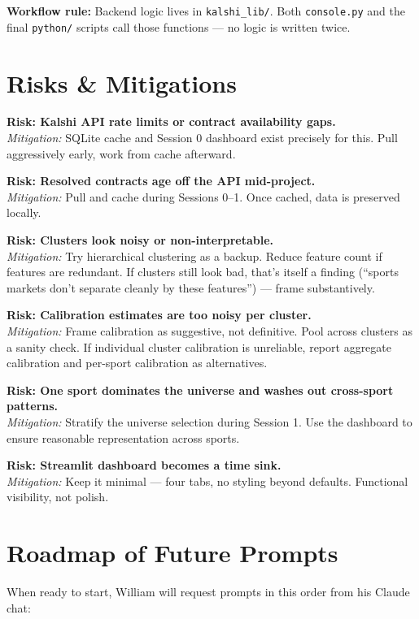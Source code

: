 \documentclass[11pt]{article}
\begin{document}
\textbf{Workflow rule:} Backend logic lives in \texttt{kalshi\_lib/}. Both \texttt{console.py} and the final \texttt{python/} scripts call those functions --- no logic is written twice.

\section{Risks \& Mitigations}

\textbf{Risk: Kalshi API rate limits or contract availability gaps.}\\
\textit{Mitigation:} SQLite cache and Session 0 dashboard exist precisely for this. Pull aggressively early, work from cache afterward.

\textbf{Risk: Resolved contracts age off the API mid-project.}\\
\textit{Mitigation:} Pull and cache during Sessions 0--1. Once cached, data is preserved locally.

\textbf{Risk: Clusters look noisy or non-interpretable.}\\
\textit{Mitigation:} Try hierarchical clustering as a backup. Reduce feature count if features are redundant. If clusters still look bad, that's itself a finding (``sports markets don't separate cleanly by these features'') --- frame substantively.

\textbf{Risk: Calibration estimates are too noisy per cluster.}\\
\textit{Mitigation:} Frame calibration as suggestive, not definitive. Pool across clusters as a sanity check. If individual cluster calibration is unreliable, report aggregate calibration and per-sport calibration as alternatives.

\textbf{Risk: One sport dominates the universe and washes out cross-sport patterns.}\\
\textit{Mitigation:} Stratify the universe selection during Session 1. Use the dashboard to ensure reasonable representation across sports.

\textbf{Risk: Streamlit dashboard becomes a time sink.}\\
\textit{Mitigation:} Keep it minimal --- four tabs, no styling beyond defaults. Functional visibility, not polish.

\section{Roadmap of Future Prompts}

When ready to start, William will request prompts in this order from his Claude chat:
\end{document}
